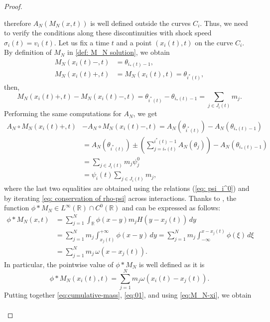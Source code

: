 \documentclass[11pt,a4paper,oneside]{amsart}
\newcommand\blu{\color{black}}
\newcommand\R{\mathbb{R}}
\begin{document}
\begin{proof}
\begin{itemize}
    therefore $A_N(M_N (x,t))$ is well defined outside the curves $C_i$.
    Thus, we need to verify the conditions along these discontinuities with shock speed $\sigma_i(t)=v_i(t)$. 
    Let us fix a time $t$ and a point 
    $(x_i(t),t)$ on the curve $C_i$. By definition of $M_N$ in \eqref{def: M_N solution}, we obtain
    \begin{align*}
        M_N(x_i(t)-,t)&=\theta_{i_*(t)-1},\\
        M_N(x_i(t)+,t)&=M_N(x_i(t),t)=\theta_{i^*(t)},
    \end{align*}
    then,
    \begin{equation}\label{eq:cumulative-mass}
        M_N(x_i(t)+,t)-M_N(x_i(t)-,t)=\theta_{i^*(t)}-\theta_{i_*(t)-1}=\sum_{j\in J_i(t)}m_j.
    \end{equation}
    Performing the same computations for $A_N$, we get
    \begin{align} \nonumber
        A_N\circ M_N(x_i(t)+,t)&-A_N\circ M_N(x_i(t)-,t)=A_N(\theta_{i^*(t)})-A_N(\theta_{i_*(t)-1})\\
 \nonumber
        &=A_N(\theta_{i^*(t)})\pm\left(\sum_{j=i_*(t)}^{i^*(t)-1}A_N(\theta_j)\right)-A_N(\theta_{i_*(t)-1})\\ \nonumber
        &=\sum_{j\in J_i(t)}m_j\psi_j^0\\&=\psi_i(t) \sum_{j\in J_i(t)}m_j,\label{eq:01}
    \end{align}
where the last two equalities are obtained using the relations (\ref{eq: psi_i^0}) and by iterating \eqref{eq: conservation of rho-psi} across interactions. 
Thanks to \cite[Th. 4.19 (Young)]{Cannarsa-D'Aprile}, the function $\phi\ast M_N\in L^\infty(\R)\cap C^0(\R)$ and {\blu can be expressed as follows:}
\begin{align*}
\phi\ast M_N(x,t) & =  \sum_{j=1}^N  \int_\R \phi(x-y) m_j H(y-x_j(t)) \, dy\\
&=   \sum_{j=1}^N  m_j \int_{x_j(t)}^{+\infty} \phi(x-y)  \, dy
=   \sum_{j=1}^N  m_j \int_{-\infty}^{x-x_j(t)} \phi(\xi)  \, d\xi
\\
&=   \sum_{j=1}^N  m_j \,\omega( x - x_j(t)).
\end{align*}
In particular, the pointwise value of $\phi\ast M_N$ is well defined as it is
\begin{equation}\label{eq:M_N-xi}
    \phi\ast M_N(x_i(t),t) = \sum_{j=1}^Nm_j\omega(x_i(t)-x_j(t)).
\end{equation}
 Putting together \eqref{eq:cumulative-mass}, \eqref{eq:01}, and using \eqref{eq:M_N-xi}, we obtain
    \begin{align*}

\end{align*}
\end{itemize}
\end{proof}
\end{document}

